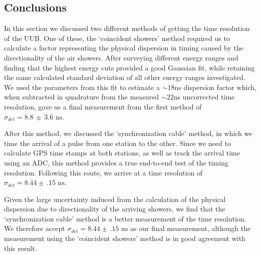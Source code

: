 \subsection{Conclusions}
In this section we discussed two different methods of getting the time resolution of the UUB. One of these, the `coincident showers' method required us to calculate a factor representing the physical dispersion in timing caused by the directionality of the air showers. After surveying different energy ranges and finding that the highest energy cuts provided a good Gaussian fit, while retaining the same calculated standard deviation of all other energy ranges investigated. We used the parameters from this fit to estimate a $\sim$18ns dispersion factor which, when subtracted in quadrature from the measured $\sim$22ns uncorrected time resolution, gave us a final measurement from the first method of $\sigma_{det}=8.8 \,\pm\, 3.6 \mbox{ ns}$. 

After this method, we discussed the `synchronization cable' method, in which we time the arrival of a pulse from one station to the other. Since we need to calculate GPS time stamps at both stations, as well as track the arrival time using an ADC, this method provides a true end-to-end test of the timing resolution. Following this route, we arrive at a time resolution of $\sigma_{det}=8.44\pm\,.15\mbox{ ns}$.

Given the large uncertainty induced from the calculation of the physical dispersion due to directionality of the arriving showers, we find that the `synchronization cable' method is a better measurement of the time resolution. We therefore accept $\sigma_{det}=8.44\pm\,.15\mbox{ ns}$ as our final measurement, although the measurement using the `coincident showers' method is in good agreement with this result.

























